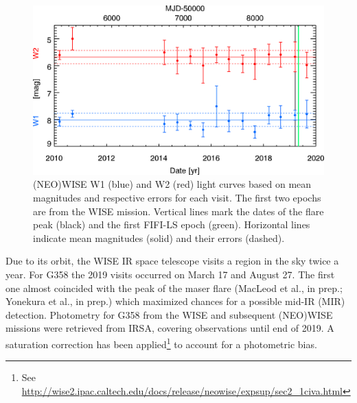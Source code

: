 \begin{figure}
	\sidecaption
	\includegraphics[width=12cm]{G358_W1_W2.png}
	\caption{(NEO)WISE W1 (blue) and W2 (red) light curves based on mean magnitudes and respective errors for each visit. The first two epochs are from the WISE mission. Vertical lines mark the dates of the flare peak (black) and the first FIFI-LS epoch (green). Horizontal lines indicate mean magnitudes (solid) and their errors (dashed).
	}
 \label{fig:NW_lc}
\end{figure}

Due to its orbit, the WISE IR space telescope \citep{2010AJ....140.1868W} visits a region in the sky twice a year. For G358 the 2019 visits occurred on March 17 and August 27. The first one almost coincided with the peak of the maser flare (MacLeod et al., in prep.; Yonekura et al., in prep.) which maximized chances for a possible mid-IR (MIR) detection.
Photometry for G358 from the WISE and subsequent (NEO)WISE \citep{2014ApJ...792...30M} missions were retrieved from IRSA, covering observations until end of 2019. A saturation correction has been applied\footnote{See\,\,\url{http://wise2.ipac.caltech.edu/docs/release/neowise/expsup/sec2\_1civa.html}} to account for a photometric bias.

